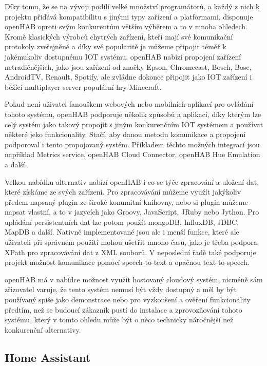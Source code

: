 Díky tomu, že se na vývoji podílí velké množství programátorů, a každý z nich k projektu přidává kompatibilitu s jinými typy zařízení a platformami, disponuje openHAB oproti svým konkurentům větším výběrem a to v mnoha ohledech. Kromě klasických výrobců chytrých zařízení, kteří mají své komunikační protokoly zveřejněné a díky své popularitě je můžeme připojit téměř k jakémukoliv dostupnému IOT systému, openHAB nabízí propojení zařízení netradičnějších, jako jsou zařízení od značky Epson, Chromecast, Bosch, Bose, AndroidTV, Renault, Spotify, ale zvládne dokonce připojit jako IOT zařízení i běžící multiplayer server populární hry Minecraft.

Pokud není uživatel fanouškem webových nebo mobilních aplikací pro ovládání tohoto systému, openHAB podporuje několik způsobů a aplikací, díky kterým lze celý systém jako takový propojit s jiným konkurenčním IOT systémem a používat některé jeko funkcionality. Stačí, aby danou metodu komunikace a propojení podporoval i tento propojovaný systém. Příkladem těchto možných integrací jsou například Metrics service, openHAB Cloud Connector, openHAB Hue Emulation a další.

Velkou nabídku alternativ nabízí openHAB i co se týče zpracování a uložení dat, které získáme ze svých zařízení. Pro zpracovávání můžeme využít jakýkoliv předem napsaný plugin ze široké konumitní knihovny, nebo si plugin můžeme napsat vlastní, a to v jazycích jako Groovy, JavaScript, JRuby nebo Jython. Pro upládání persistentních dat lze potom použít mongoDB, InfluxDB, JDBC, MapDB a další. Nativně implementované jsou ale i menší funkce, které ale uživateli při správném použití mohou ušetřit mnoho času, jako je třeba podpora XPath pro zpracovávání dat z XML souborů. V neposlední řadě také podporuje projekt možnost komunikace pomocí speech-to-text a opačnou text-to-speech.

openHAB má v nabídce možnost využít hostovaný cloudový systém, nicméně sám zřizovatel varuje, že tento systém nemusí být vždy dostupný a měl by být používaný spíše jako demonstrace nebo pro vyzkoušení a ověření funkcionality předtím, než se budoucí zákazník pustí do instalace a zprovozňování tohoto systému, který v tomto ohledu může být o něco technicky náročnější než konkurenční alternativy.

\subsection{Home Assistant}

